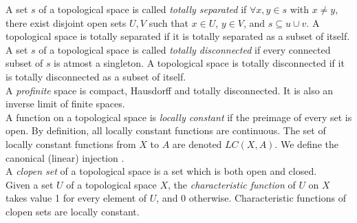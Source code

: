 \documentclass[11pt]{article}
\begin{document}
A set $s$ of a topological space is called \textit{totally separated} if $\forall x, y \in s$ with
$x \ne y$, there exist disjoint open sets $U, V$ such that $x \in U$, $y \in V$, and
$s \subseteq u ∪ v$. A topological space is totally separated if it is totally separated as a
subset of itself. \\

A set $s$ of a topological space is called \textit{totally disconnected} if every connected subset
of $s$ is atmost a singleton. A topological space is totally disconnected if it is
totally disconnected as a subset of itself. \\

A \textit{profinite} space is compact, Hausdorff and totally disconnected. It is also an inverse limit of
finite spaces. \\

A function on a topological space is \textit{locally constant} if the preimage of every set is open. By
definition, all locally constant functions are continuous. The set of locally constant functions
from $X$ to $A$ are denoted $LC(X, A)$. We define the canonical (linear) injection
. \\

A \textit{clopen set} of a topological space is a set which is both open and closed. \\

Given a set $U$ of a topological space $X$, the \textit{characteristic function} of $U$ on $X$ takes value 1
for every element of $U$, and 0 otherwise. Characteristic functions of clopen sets are locally
constant. \\
\end{document}
